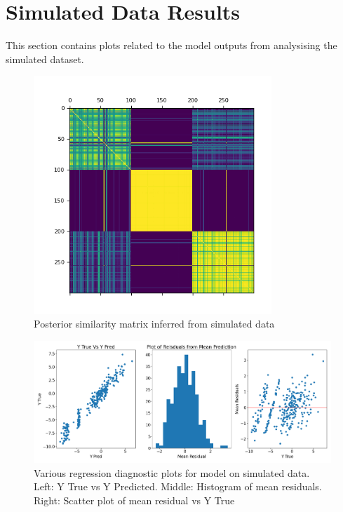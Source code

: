 \documentclass{article}
\begin{document}
\section{Simulated Data Results}
This section contains plots related to the model outputs from analysising the simulated dataset.

\begin{figure}[h]
  \centering
  \includegraphics[width=0.8\textwidth]{Plots/Simulated Posterior Similarity Matrix.png}
  \caption{Posterior similarity matrix inferred from simulated data}
  \label{fig:sim_post_mat}
\end{figure}

\begin{figure}[h]
  \centering
  \includegraphics[width=1\textwidth]{Plots/simuated_diagnostics.png}
  \caption{Various regression diagnostic plots for model on simulated data. Left: Y True vs Y Predicted. Middle: Histogram of mean residuals. Right: Scatter plot of mean residual vs Y True}
  \label{fig:sim_diag_plots}
\end{figure}
\end{document}
